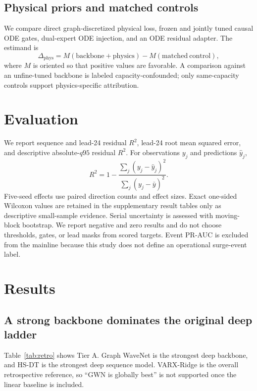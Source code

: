 \documentclass[final,5p,times,twocolumn]{elsarticle}
\begin{document}
\subsection{Physical priors and matched controls}
We compare direct graph-discretized physical loss, frozen and jointly tuned causal ODE gates, dual-expert ODE injection, and an ODE residual adapter. The estimand is
\begin{equation}
\Delta_{\mathrm{phys}}=M(\mathrm{backbone+physics})-M(\mathrm{matched\ control}),
\end{equation}
where $M$ is oriented so that positive values are favorable. A comparison against an unfine-tuned backbone is labeled capacity-confounded; only same-capacity controls support physics-specific attribution.

\section{Evaluation}
We report sequence and lead-24 residual $R^2$, lead-24 root mean squared error, and descriptive absolute-$q95$ residual $R^2$. For observations $y_j$ and predictions $\hat y_j$,
\begin{equation}
R^2=1-\frac{\sum_j(y_j-\hat y_j)^2}{\sum_j(y_j-\bar y)^2}.
\end{equation}
Five-seed effects use paired direction counts and effect sizes. Exact one-sided Wilcoxon values are retained in the supplementary result tables only as descriptive small-sample evidence. Serial uncertainty is assessed with moving-block bootstrap. We report negative and zero results and do not choose thresholds, gates, or lead masks from scored targets. Event PR-AUC is excluded from the mainline because this study does not define an operational surge-event label.

\section{Results}
\subsection{A strong backbone dominates the original deep ladder}
Table~\ref{tab:retro} shows Tier A. Graph WaveNet is the strongest deep backbone, and HS-DT is the strongest deep sequence model. VARX-Ridge is the overall retrospective reference, so ``GWN is globally best'' is not supported once the linear baseline is included.
\end{document}
